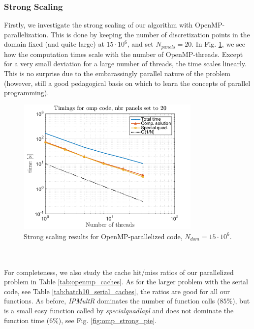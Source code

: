 \documentclass[a4paper,10pt]{article}
\begin{document}
\subsubsection*{Strong Scaling}
Firstly, we investigate the strong scaling of our algorithm with OpenMP-parallelization. This is done by keeping the number of discretization points in the domain fixed (and quite large) at $15\cdot10^{6}$, and set $N_{panels}=20$. In Fig. \ref{fig:omp_strongtime}, we see how the computation times scale with the number of OpenMP-threads. Except for a very small deviation for a large number of threads, the time scales linearly. This is no surprise due to the embarassingly parallel nature of the problem (however, still a good pedagogical basis on which to learn the concepts of parallel programming). 
\begin{figure}[ht]
    \begin{center}
        \includegraphics[width=0.8\textwidth]{Graphics/omp_fixed_domain_size_loglog.png}
    \end{center}
    \caption{Strong scaling results for OpenMP-parallelized code, $N_{dom}=15\cdot 10^6$.}
    \label{fig:omp_strongtime}
\end{figure}
\\ \\
For completeness, we also study the cache hit/miss ratios of our parallelized problem in Table \ref{tab:openmp_caches}. As for the larger problem with the serial code, see Table \ref{tab:batch10_serial_caches}, the ratios are good for all our functions. As before, \textit{IPMultR} dominates the number of function calls ($85\%$), but is a small easy function called by \textit{specialquadlapl} and does not dominate the function time ($6\%$), see Fig. \ref{fig:omp_strong_pie}. 
\end{document}
